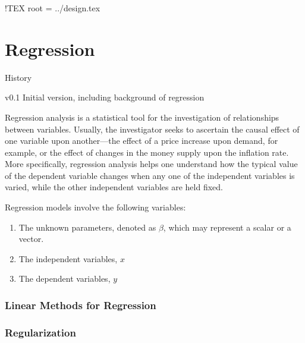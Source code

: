 !TEX root = ../design.tex

\chapter[Regression]{Regression}
\begin{moduleinfo}
\item[History]
	\begin{modulehistory}
		\item[v0.1] Initial version, including background of regression
	\end{modulehistory}
\end{moduleinfo}


Regression analysis is a statistical tool for the investigation of
relationships between variables. Usually, the investigator seeks to ascertain
the causal effect of one variable upon another—the effect of a price increase
upon demand, for example, or the effect of changes in the money supply upon the
inflation rate. More specifically, regression analysis helps one understand how
the typical value of the dependent variable changes when any one of the
independent variables is varied, while the other independent variables are held
fixed.

Regression models involve the following variables:
\begin{enumerate}
    \item The unknown parameters, denoted as $\beta$, which may represent a scalar or a vector.
    \item The independent variables, $x$
    \item The dependent variables, $y$
\end{enumerate}

\subsection{Linear Methods for Regression} %
\label{sub:linear_methods_for_regression}


\subsection{Regularization} %
\label{sub:regularization}

